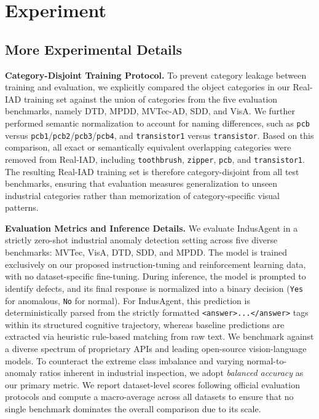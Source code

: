 \documentclass{llmxive}
\begin{document}
{\section{Experiment}
\label{appx:Experimentapp}




\subsection{More Experimental Details}
\label{appx:exp_details}

\textbf{Category-Disjoint Training Protocol.}
To prevent category leakage between training and evaluation, we explicitly compared the object categories in our Real-IAD training set against the union of categories from the five evaluation benchmarks, namely DTD, MPDD, MVTec-AD, SDD, and VisA. 
We further performed semantic normalization to account for naming differences, such as \texttt{pcb} versus \texttt{pcb1}/\texttt{pcb2}/\texttt{pcb3}/\texttt{pcb4}, and \texttt{transistor1} versus \texttt{transistor}. 
Based on this comparison, all exact or semantically equivalent overlapping categories were removed from Real-IAD, including \texttt{toothbrush}, \texttt{zipper}, \texttt{pcb}, and \texttt{transistor1}. 
The resulting Real-IAD training set is therefore category-disjoint from all test benchmarks, ensuring that evaluation measures generalization to unseen industrial categories rather than memorization of category-specific visual patterns.


\textbf{Evaluation Metrics and Inference Details.}
We evaluate IndusAgent in a strictly zero-shot industrial anomaly detection setting across five diverse benchmarks: MVTec, VisA, DTD, SDD, and MPDD. The model is trained exclusively on our proposed instruction-tuning and reinforcement learning data, with no dataset-specific fine-tuning. During inference, the model is prompted to identify defects, and its final response is normalized into a binary decision (\texttt{Yes} for anomalous, \texttt{No} for normal). For IndusAgent, this prediction is deterministically parsed from the strictly formatted \texttt{<answer>...</answer>} tags within its structured cognitive trajectory, whereas baseline predictions are extracted via heuristic rule-based matching from raw text. We benchmark against a diverse spectrum of proprietary APIs and leading open-source vision-language models. To counteract the extreme class imbalance and varying normal-to-anomaly ratios inherent in industrial inspection, we adopt \emph{balanced accuracy} as our primary metric. We report dataset-level scores following official evaluation protocols and compute a macro-average across all datasets to ensure that no single benchmark dominates the overall comparison due to its scale.

}
\end{document}
